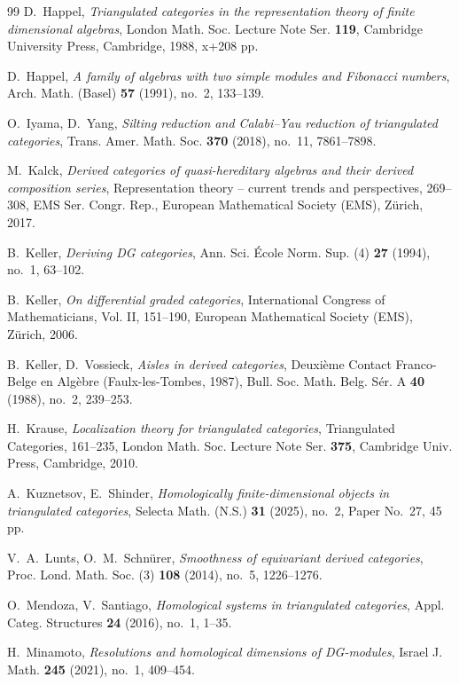 \documentclass[a4paper,reqno,11pt]{amsart}
\numberwithin{equation}{section}
\theoremstyle{definition}
\begin{document}
\begin{thebibliography}{99}
 D.~Happel, \emph{Triangulated categories in the representation theory of finite dimensional algebras}, London Math. Soc. Lecture Note Ser. \textbf{119}, Cambridge University Press, Cambridge, 1988, x+208 pp.

 D.~Happel, \emph{A family of algebras with two simple modules and Fibonacci numbers}, Arch. Math. (Basel) \textbf{57} (1991), no.~2, 133--139.

 O.~Iyama, D.~Yang, \emph{Silting reduction and Calabi--Yau reduction of triangulated categories}, Trans. Amer. Math. Soc. \textbf{370} (2018), no.~11, 7861--7898.

 M.~Kalck, \emph{Derived categories of quasi-hereditary algebras and their derived composition series}, Representation theory -- current trends and perspectives, 269--308, EMS Ser. Congr. Rep., European Mathematical Society (EMS), Z\"urich, 2017.

 B.~Keller, \emph{Deriving DG categories}, Ann. Sci. \'Ecole Norm. Sup. (4) \textbf{27} (1994), no.~1, 63--102.

 B.~Keller, \emph{On differential graded categories}, International Congress of Mathematicians, Vol. II, 151--190, European Mathematical Society (EMS), Z\"urich, 2006.

 B.~Keller, D.~Vossieck, \emph{Aisles in derived categories}, Deuxi\`eme Contact Franco-Belge en Alg\`ebre (Faulx-les-Tombes, 1987), Bull. Soc. Math. Belg. S\'er. A \textbf{40} (1988), no.~2, 239--253.

 H.~Krause, \emph{Localization theory for triangulated categories}, Triangulated Categories, 161--235, London Math. Soc. Lecture Note Ser. \textbf{375}, Cambridge Univ. Press, Cambridge, 2010.

 A.~Kuznetsov, E.~Shinder, \emph{Homologically finite-dimensional objects in triangulated categories}, Selecta Math. (N.S.) \textbf{31} (2025), no.~2, Paper No.~27, 45 pp.

 V.~A.~Lunts, O.~M.~Schn\"urer, \emph{Smoothness of equivariant derived categories}, Proc. Lond. Math. Soc. (3) \textbf{108} (2014), no.~5, 1226--1276.

 O.~Mendoza, V.~Santiago, \emph{Homological systems in triangulated categories}, Appl. Categ. Structures \textbf{24} (2016), no.~1, 1--35.

 H.~Minamoto, \emph{Resolutions and homological dimensions of DG-modules}, Israel J. Math. \textbf{245} (2021), no.~1, 409--454.


\end{thebibliography}
\end{document}
